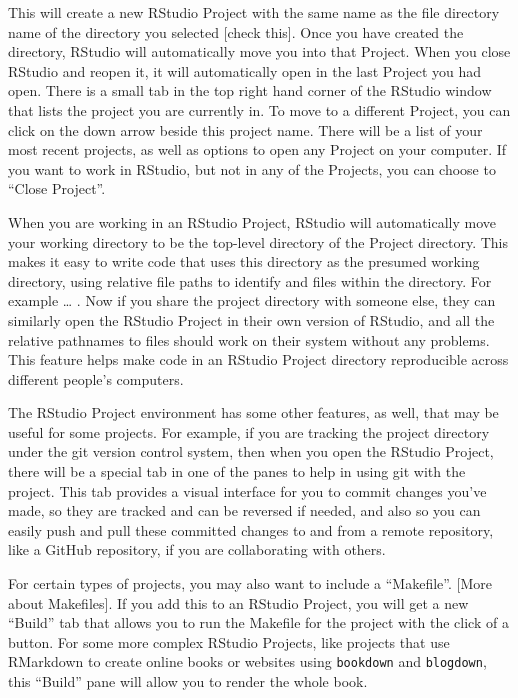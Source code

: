 \documentclass[]{tufte-book}
\begin{document}
This will create a new RStudio Project with the same name as the file directory
name of the directory you selected {[}check this{]}. Once you have created the
directory, RStudio will automatically move you into that Project. When you
close RStudio and reopen it, it will automatically open in the last Project
you had open. There is a small tab in the top right hand corner of the RStudio
window that lists the project you are currently in. To move to a different Project,
you can click on the down arrow beside this project name. There will be a list
of your most recent projects, as well as options to open any Project on your
computer. If you want to work in RStudio, but not in any of the Projects, you can
choose to ``Close Project''.

When you are working in an RStudio Project, RStudio will automatically move your
working directory to be the top-level directory of the Project directory. This
makes it easy to write code that uses this directory as the presumed working
directory, using relative file paths to identify and files within the directory.
For example \ldots{} . Now if you share the project directory with someone else, they
can similarly open the RStudio Project in their own version of RStudio, and all
the relative pathnames to files should work on their system without any problems.
This feature helps make code in an RStudio Project directory reproducible across
different people's computers.

The RStudio Project environment has some other features, as well, that may be
useful for some projects. For example, if you are tracking the project directory
under the git version control system, then when you open the RStudio Project,
there will be a special tab in one of the panes to help in using git with the
project. This tab provides a visual interface for you to commit changes you've made,
so they are tracked and can be reversed if needed, and also so you can easily
push and pull these committed changes to and from a remote repository, like a
GitHub repository, if you are collaborating with others.

For certain types of projects, you may also want to include a ``Makefile''. {[}More
about Makefiles{]}. If you add this to an RStudio Project, you will get a new
``Build'' tab that allows you to run the Makefile for the project with the click of
a button. For some more complex RStudio Projects, like projects that use RMarkdown
to create online books or websites using \texttt{bookdown} and \texttt{blogdown}, this ``Build''
pane will allow you to render the whole book.
\end{document}

